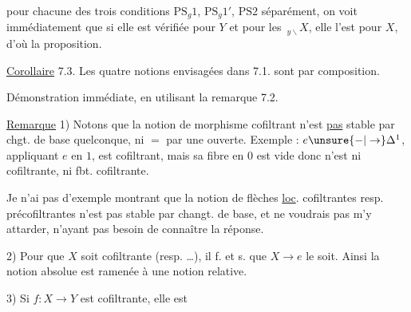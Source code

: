 pour chacune des trois conditions $\mathrm{PS}_g1$, $\mathrm{PS}_g1'$, $\mathrm{PS}2$
séparément, on voit immédiatement que si
elle est vérifiée pour $Y$ et pour les $\,{}_{y\backslash}X$,
elle l'est pour $X$, d'où la proposition.

\uline{Corollaire} 7.3. Les quatre notions envisagées
dans 7.1. sont  par composition.

Démonstration immédiate, en
utilisant la remarque 7.2.

\uline{Remarque}  1) Notons que
la notion de morphisme cofiltrant
 n'est \uline{pas} stable par
chgt. de base quelconque, ni $=$ par une
 ouverte. Exemple : $e\unsure{-|\to}\Delta^1$, appliquant
$e$ en $1$, est cofiltrant, mais sa
fibre en $0$ est vide donc n'est
ni cofiltrante, ni fbt. cofiltrante.

Je n'ai pas  d'exemple montrant que la
notion de flèches \uline{loc}. cofiltrantes resp. précofiltrantes
n'est pas stable par changt. de base, et ne voudrais pas m'y attarder, n'ayant pas besoin de
connaître la réponse.

2) Pour que $X$ soit cofiltrante (resp. \ldots),
il f. et s. que $X\longrightarrow e$ le soit. Ainsi la
notion absolue est ramenée à une notion
relative.

3) Si $f:X\to Y$ est cofiltrante, elle est
